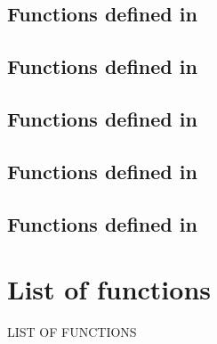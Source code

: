 \documentclass[english,a4paper,11pt,oldtoc,mctitle]{rapport3}
\begin{document}
\section{Functions defined in }
\label{sec:queryref}


\section{Functions defined in }
\label{sec:menuref}


\section{Functions defined in }
\label{sec:dockref}


\section{Functions defined in }
\label{sec:spref}


\section{Functions defined in }
\label{sec:deref}


\appendix



\chapter*{List of functions}
%
         {\MakeUppercase{List of functions}}%

\makeatletter
\def\fnlisti#1{\@dottedtocline{1}{0em}{1.5em}{\lstinline!#1!}{\pageref{fn:#1}}}
{\parskip\z@}
\makeatother

\begin{htmlonly}
\newcommand{\fnlisti}[1]{\fnref{#1}\\}

\end{htmlonly}



\printindex
\end{document}
